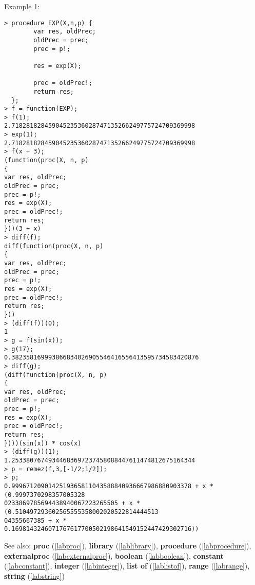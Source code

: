 \noindent Example 1: 
\begin{center}\begin{minipage}{15cm}\begin{Verbatim}[frame=single]
> procedure EXP(X,n,p) {
        var res, oldPrec;
        oldPrec = prec;
        prec = p!;
        
        res = exp(X);
        
        prec = oldPrec!;
        return res;
  };
> f = function(EXP);
> f(1);
2.71828182845904523536028747135266249775724709369998
> exp(1);
2.71828182845904523536028747135266249775724709369998
> f(x + 3);
(function(proc(X, n, p)
{
var res, oldPrec;
oldPrec = prec;
prec = p!;
res = exp(X);
prec = oldPrec!;
return res;
}))(3 + x)
> diff(f);
diff(function(proc(X, n, p)
{
var res, oldPrec;
oldPrec = prec;
prec = p!;
res = exp(X);
prec = oldPrec!;
return res;
}))
> (diff(f))(0);
1
> g = f(sin(x));
> g(17);
0.382358169993866834026905546416556413595734583420876
> diff(g);
(diff(function(proc(X, n, p)
{
var res, oldPrec;
oldPrec = prec;
prec = p!;
res = exp(X);
prec = oldPrec!;
return res;
})))(sin(x)) * cos(x)
> (diff(g))(1);
1.25338076749344683697237458088447611474812675164344
> p = remez(f,3,[-1/2;1/2]);
> p;
0.9996712090142519365811043588840936667986880903378 + x * (0.9997370298357005328
0233869785694438940067223265505 + x * (0.510497293602565555358002020522814444513
04355667385 + x * 0.1698143246071767617700502198641549152447429302716))
\end{Verbatim}
\end{minipage}\end{center}
See also: \textbf{proc} (\ref{labproc}), \textbf{library} (\ref{lablibrary}), \textbf{procedure} (\ref{labprocedure}), \textbf{externalproc} (\ref{labexternalproc}), \textbf{boolean} (\ref{labboolean}), \textbf{constant} (\ref{labconstant}), \textbf{integer} (\ref{labinteger}), \textbf{list of} (\ref{lablistof}), \textbf{range} (\ref{labrange}), \textbf{string} (\ref{labstring})
